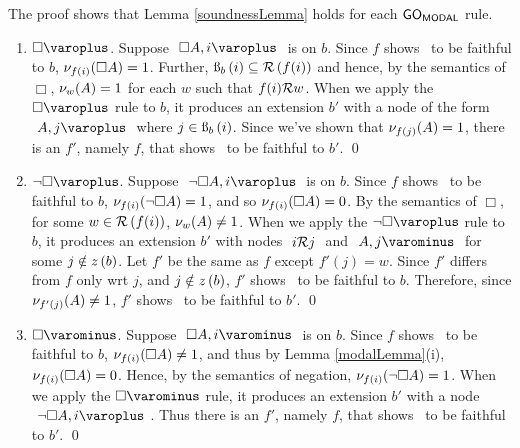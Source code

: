 \begin{proof*}
The proof shows that Lemma \ref{soundnessLemma} holds for each $ \mathsf{GO}_{\mathsf{MODAL}} $ rule.

	\begin{enumerate}

		\item $\dRule{ \Box }$. Suppose $ \like{ \dNode{ \Box A }{ i }} $ is on $ b $.
						Since $ f $ shows \Model\ to be faithful to $ b $, $ \mathcal{\nu}_{ f(i) }({ \Box A }) = 1 $.
						 Further, $ \text{\ss}_{b}\left({i}\right) \subseteq \mathcal{R}\left({ f(i) }\right) $ and 
							hence, by the semantics of $ \Box $, $ \mathcal{\nu}_{ w }({ A }) = 1 $ for each $ w $ such that $ { f(i) } \mathcal{R} { w } $. 
						 When we apply the $ \dRule{ \Box } $ rule to $ b $, 
								it produces an extension $ b' $ with a node of the form $ \like{ \dNode{ A }{ j }} $ where $ j \in \text{\ss}_{b}\left({i}\right)$.
						 Since we've shown that $ \mathcal{\nu}_{ f(j) }({ A }) = 1 $, there is an $ f' $, namely $ f $, that shows \Model\ to be faithful to $ b' $. 
						\qed

		\item $\dRule{ \neg \Box }$. Suppose $ \like{ \dNode{ \neg \Box A }{ i }}$ is on $ b $.
							Since $ f $ shows \Model\ to be faithful to $ b $, $ \mathcal{\nu}_{ f(i) }({ \neg \Box A }) = 1 $, 
							and so $ \mathcal{\nu}_{ f(i) }({ \Box A }) = 0 $.
							By the semantics of $ \Box $, for some $ w \in \mathcal{R}\left({ f(i) }\right) $, $ \mathcal{\nu}_{ w }({ A }) \neq 1 $. 
							When we apply the $ \dRule{ \neg \Box } $ rule to $ b $, 
								it produces an extension $ b' $ with nodes $ \ {  { i } \mathcal{R} { j } }\  $ and $ \like{ \uNode{ A }{ j }} $ for some $ j \notin z\left({b}\right) $.
							Let $ f' $ be the same as $ f $ except $ f'( j ) = w $. 
							Since $ f' $ differs from $ f $ only wrt $ j $, and $ j \notin z\left({b}\right) $, $ f' $ shows \Model\ to be faithful to $ b $.
							Therefore, since $ \mathcal{\nu}_{ f'( j )}({ A }) \neq 1 $, $ f' $ shows \Model\ to be faithful to $ b' $.  
							\qed

		\item $\uRule{ \Box }$. Suppose $ \like{ \uNode{ \Box A }{ i }} $ is on $ b $.
							Since $ f $ shows \Model\ to be faithful to $ b $, $ \mathcal{\nu}_{ f(i) }({ \Box A }) \neq 1 $, 
							and thus by Lemma \ref{modalLemma}(i), $ \mathcal{\nu}_{ f(i) }({ \Box A }) = 0 $.
							Hence, by the semantics of negation, $ \mathcal{\nu}_{ f(i) }({ \neg \Box A }) = 1 $.
							When we apply the $ \uRule{ \Box } $ rule, it produces an extension $ b' $ with a node $ \like{ \dNode{ \neg \Box A }{ i }} $.
							Thus there is an $ f' $, namely $ f $, that shows \Model\ to be faithful to $ b' $.  
							\qed


\end{enumerate}
\end{proof*}
